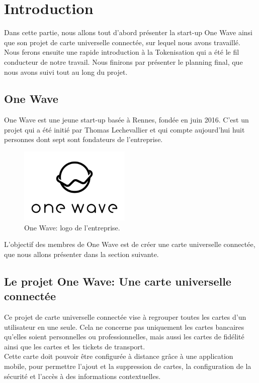 \documentclass{report}
\begin{document}
\chapter{Introduction}
Dans cette partie, nous allons tout d'abord présenter la start-up One Wave ainsi que son projet de carte universelle connectée, sur lequel nous avons travaillé. Nous ferons ensuite une rapide introduction à la Tokenisation qui a été le fil conducteur de notre travail. Nous finirons par présenter le planning final, que nous avons suivi tout au long du projet.


\section{One Wave}
One Wave est une jeune start-up basée à Rennes, fondée en juin 2016. C'est un projet qui a été initié par Thomas Lechevallier et qui compte aujourd'hui huit personnes dont sept sont fondateurs de l'entreprise.

\begin{figure}[!h]
    \centering
			\includegraphics{img/onewave.png}
			\caption{\label{One Wave} One Wave: logo de l'entreprise.}			
\end{figure}

L'objectif des membres de One Wave est de créer une carte universelle connectée, que nous allons présenter dans la section  suivante.


\section{Le projet One Wave: Une carte universelle connectée}
Ce projet de carte universelle connectée vise à regrouper toutes les cartes d'un utilisateur en une seule. Cela ne concerne pas uniquement les cartes bancaires qu'elles soient personnelles ou professionnelles, mais aussi les cartes de fidélité ainsi que les cartes et les tickets de transport.\\
Cette carte doit pouvoir être configurée à distance grâce à une application mobile, pour permettre l'ajout et la suppression de cartes, la configuration de la sécurité et l'accès à des informations contextuelles.
\end{document}
